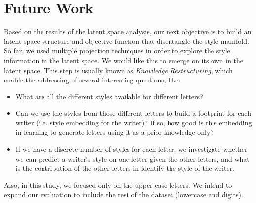 \documentclass[conference]{IEEEtran}
\begin{document}
\section{Future Work}
\par Based on the results of the latent space analysis, our next objective is to build an latent space structure and objective function that disentangle the style manifold. So far, we used multiple projection techniques in order to explore the style information in the latent space. We would like this to emerge on its own in the latent space. This step is usually known as \textit{Knowledge Restructuring}, which enable the addressing of several interesting questions, like:
\begin{itemize}
    \item What are all the different styles available for different letters?
    \item Can we use the styles from those different letters to build a footprint for each writer (i.e. style embedding for the writer)? If so, how good is this embedding in learning to generate letters using it as a prior knowledge only?
    \item If we have a discrete number of styles for each letter, we investigate whether we can predict a writer's style on one letter given the other letters, and what is the contribution of the other letters in identify the style of the writer.
\end{itemize}

\par Also, in this study, we focused only on the upper case letters. We intend to expand our evaluation to include the rest of the dataset (lowercase and digits).

{}
\end{document}
